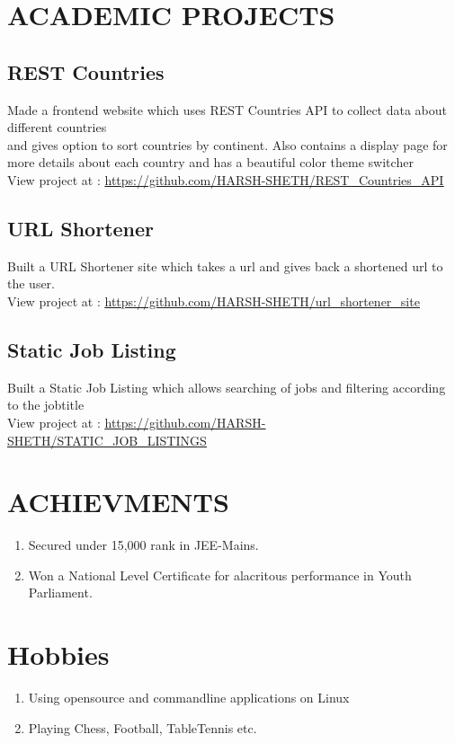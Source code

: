 \documentclass[12pt]{article}
\begin{document}
\section{ACADEMIC PROJECTS}
\subsection*{REST Countries}
  \parbox{\textwidth}{ Made a frontend website which uses REST Countries API to collect data about different countries\\
   and gives option to sort countries by continent. Also contains a display page for more details about each country and has a beautiful color theme switcher\\
   View project at : \underline{\url{https://github.com/HARSH-SHETH/REST_Countries_API}}
  }
\subsection*{URL Shortener}
\parbox{\textwidth}{ Built a URL Shortener site which takes a url and gives back a shortened url to the user.  
\\ View project at : \underline{\url{https://github.com/HARSH-SHETH/url_shortener_site}}
}

\subsection*{Static Job Listing}
\parbox{\textwidth}{ Built a Static Job Listing which allows searching of jobs and filtering according to the jobtitle
\\ View project at : \underline{\url{https://github.com/HARSH-SHETH/STATIC_JOB_LISTINGS}}
}
\newpage
\section{ACHIEVMENTS}
\begin{enumerate}
  \item Secured under 15,000 rank in JEE-Mains.
  \item Won a National Level Certificate for alacritous performance in Youth Parliament.
\end{enumerate}

\section{Hobbies}
\begin{enumerate}
  \item Using opensource and commandline applications on Linux
  \item Playing Chess, Football, TableTennis etc.
\end{enumerate}
\end{document}

